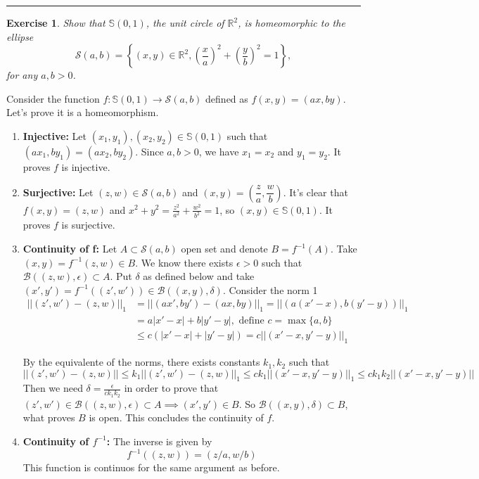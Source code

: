 \documentclass[a4paper,11pt]{article}
\newcommand{\linia}{\rule{\linewidth}{0.5pt}}
\theoremstyle{mytheor}
\theoremstyle{mytheor}
\newtheorem{exercise}{Exercise}
\theoremstyle{remark}
\newcommand{\B}{\mathcal{B}}
\newcommand{\R}{\mathbb{R}}
\begin{document}
\noindent\linia

\begin{exercise}
    Show that $\mathbb{S}(0, 1)$, the unit circle of $\R^2$, is homeomorphic
    to the ellipse 
    $$
    \mathcal{S}(a,b) = \left\{(x,y) \in \R^2,\left(\frac{x}{a}\right)^2 + \left(\frac{y}{b}\right)^2 = 1 \right\},
    $$
    for any $a, b > 0$. 
\end{exercise}

Consider the function $f : \mathbb{S}(0,1) \to \mathcal{S}(a,b)$ defined as
$f(x,y) = (ax, by)$. Let's prove it is a homeomorphism. 

\begin{enumerate}
    \item \textbf{Injective:} Let $(x_1, y_1), (x_2, y_2) \in \mathbb{S}(0,1)$
    such that $(ax_1, by_1) = (ax_2, by_2)$. Since $a, b > 0$, we have $x_1 =
    x_2$ and $y_1 = y_2$. It proves $f$ is injective. 

    \item \textbf{Surjective:} Let $(z,w) \in \mathcal{S}(a,b)$ and $(x,y) =
    \left(\dfrac{z}{a}, \dfrac{w}{b}\right)$. It's clear that $f(x,y) = (z,w)$
    and $x^2 + y^2 = \frac{z^2}{a^2} + \frac{w^2}{b^2} = 1$, so $(x,y) \in
    \mathbb{S}(0,1)$. It proves $f$ is surjective. 
    
    \item \textbf{Continuity of f:} Let $A \subset \mathcal{S}(a,b)$ open set and denote
    $B = f^{-1}(A)$. Take $(x,y) = f^{-1}(z,w) \in B$. We know there exists
    $\epsilon > 0$ such that $\B((z,w), \epsilon) \subset A$. Put $\delta$ as
    defined below and 
    take $(x', y') = f^{-1}((z', w')) \in \B((x,y),\delta)$. Consider the norm
    1
    \begin{equation*}
        \begin{split}
            ||(z',w')-(z,w)||_1 &= ||(ax', by') - (ax, by)||_1 = ||\left(a(x' - x), b(y' - y)\right)||_1 \\ 
            &= a|x' - x| + b|y' - y|, \text{ define } c = \max\{a,b\}\\        
            &\le c(|x' - x| + |y' - y|) = c||(x' - x, y' - y)||_1
        \end{split}
    \end{equation*}

    By the equivalente of the norms, there exists constants $k_1, k_2$ such that 
    $$
    ||(z',w')-(z,w)|| \le k_1||(z',w')-(z,w)||_1 \le ck_1||(x' - x, y' - y)||_1 \le ck_1k_2||(x' - x, y' - y)|| 
    $$
    Then we need $\delta = \frac{\epsilon}{c k_1 k_2}$ in order to prove that
    $(z',w') \in \B((z,w), \epsilon) \subset A \implies (x',y') \in B$. So
    $\B((x,y),\delta) \subset B$, what proves $B$ is open. This concludes the
    continuity of $f$. 

    \item \textbf{Continuity of $f^{-1}$:} The inverse is given by 
    $$
    f^{-1}((z,w)) = (z/a, w/b)
    $$
    This function is continuos for the same argument as before. 
\end{enumerate}
\end{document}
